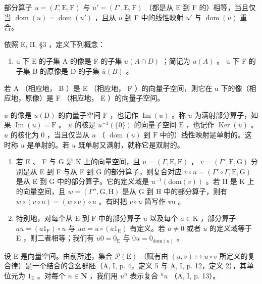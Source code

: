 部分算子 \(u = (\Gamma, \mathrm{E}, \mathrm{F})\) 与 \(u' = (\Gamma', \mathrm{E}, \mathrm{F})\) （都是从 E 到 F 的）相等，当且仅当 \(\operatorname{dom}(u) = \operatorname{dom}(u')\) ，且从 \(u\) 到 F 中的线性映射 \(u'\) 与 \(\operatorname{dom}(u)\) 重合。

依照 E, II, §3 ，定义下列概念：

\begin{enumerate}
\def\labelenumi{(\roman{enumi})}
\tightlist
\item
  u 下 E 的子集 A 的像是 F 的子集 \(u(A \cap D)\) ；简记为 \(u(A)\) 。 u 下 F 的子集 B 的原像是 D 的子集 \(\overline{u}(B)\) 。
\end{enumerate}

若 A （相应地， B ）是 E （相应地， F ）的向量子空间，则它在 u 下的像（相应地，原像）是 F （相应地， E ）的向量子空间。

 \(u\) 的像是 \(u(\mathrm{D})\) 的向量子空间 \(\mathrm{F}\) ，也记作 \(\operatorname{Im}(u)\) 。称 \(u\) 为满射部分算子，如果 \(\operatorname{Im}(u) = \mathrm{F}\) 。 \(u\) 的核是 \(u^{-1}(\{0\})\) 的向量子空间 \(\mathrm{E}\) ，也记作 \(\operatorname{Ker}(u)\) 。 \(u\) 的核化为 0 ，当且仅当从 \(u\) （ \(\operatorname{dom}(u)\) 到 \(\mathrm{F}\) 中的）线性映射是单射的。这时称 \(u\) 是单射的。若 \(u\) 既单射又满射，就称它是双射的。

\begin{enumerate}
\def\labelenumi{(\roman{enumi})}
\setcounter{enumi}{1}
\item
  若 E 、 F 与 G 是 K 上的向量空间，且 \(u = (\Gamma, \mathrm{E}, \mathrm{F})\) ， \(v = (\Gamma', \mathrm{F}, \mathrm{G})\) 分别是从 E 到 F 与从 F 到 G 的部分算子，则复合对应 \(v \circ u = (\Gamma' \circ \Gamma, \mathrm{E}, \mathrm{G})\) 是从 E 到 G 中的部分算子。它的定义域是 \(u^{-1}(\mathrm{dom}(v))\) 。若 H 是 K 上的向量空间，且 \(w = (\Gamma'', \mathrm{G}, \mathrm{H})\) 是从 G 到 H 中的部分算子，则有 \(w \circ (v \circ u) = (w \circ v) \circ u\) 。有时把 \(v \circ u\) 简写作 vu 。
\item
  特别地，对每个从 E 到 F 中的部分算子 \(u\) 以及每个 \(a \in \mathrm{K}\) ，部分算子 \(au = (a1_{\mathrm{F}}) \circ u\) 与 \(ua = u \circ (a1_{\mathrm{E}})\) 有定义。若 \(a \neq 0\) 或者 \(u\) 的定义域等于 E ，则二者相等；我们有 \(u0 = 0_{\mathrm{E}}\) 与 \(0u = 0_{\mathrm{dom}(u)}\) 。
\end{enumerate}

设 E 是向量空间。由前所述，集合 \(\mathcal{P}(\mathrm{E})\) （赋有由 \((u,v)\mapsto u\circ v\) 所定义的复合律）是一个结合的含幺群胚（A, I, p. 4，定义 5 与 A, I, p. 12，定义 2），其单位元为 \(1_{\mathrm{E}}\) 。对每个 \(n\in \mathbf{N}\) ，我们用 \(u^n\) 表示复合 \({}^n u\) （A, I, p. 13）。


